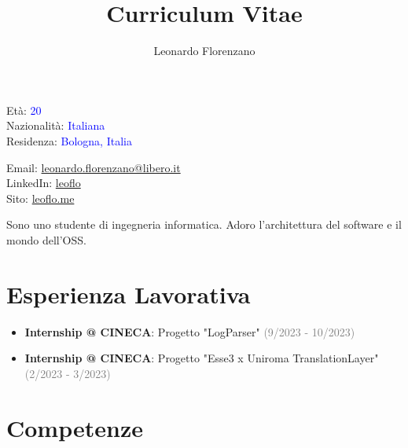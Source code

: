 \documentclass{paper}
\title{Curriculum Vitae}
\author{Leonardo Florenzano}
\begin{document}
\maketitle

\begin{multicols}{2}

\noindent
Età: \textcolor{blue}{20}\\
Nazionalità: \textcolor{blue}{Italiana}\\
Residenza: \textcolor{blue}{Bologna, Italia}

\columnbreak

\noindent
Email: \href{mailto:leonardo.florenzano@libero.it}{leonardo.florenzano@libero.it}\\
LinkedIn: \href{https://www.linkedin.com/in/leoflo}{leoflo}\\
Sito: \href{https://leoflo.me}{leoflo.me}

\end{multicols}

\noindent
Sono uno studente di ingegneria informatica.
Adoro l'architettura del software e il mondo dell'OSS.

\section{Esperienza Lavorativa}

\begin{itemize}
    \item \textbf{Internship @ CINECA}: Progetto "LogParser" \textcolor{gray}{(9/2023 - 10/2023)}
    \item \textbf{Internship @ CINECA}: Progetto "Esse3 x Uniroma TranslationLayer" \textcolor{gray}{(2/2023 - 3/2023)}
\end{itemize}

\section{Competenze}
\end{document}
